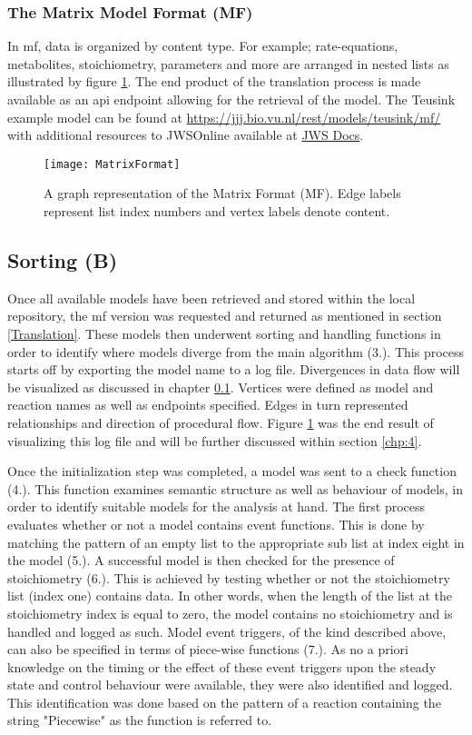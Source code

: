 \subsubsection{The Matrix Model Format (MF)}
In \gls{mf}, data is organized by content type. For example; rate-equations, metabolites, stoichiometry, parameters and more are arranged in nested lists as illustrated by figure \ref{fig:MatrixFormat}. The end product of the translation process is made available as an \gls{api} endpoint allowing for the retrieval of the model. The Teusink example model can be found at \href{https://jjj.bio.vu.nl/rest/models/teusink/mf/}{https://jjj.bio.vu.nl/rest/models/teusink/mf/} with additional resources to JWSOnline available at \href{http://jws-docs.readthedocs.io/8_rest.html}{JWS Docs}.

\begin{figure}[p]
\texttt{[image: MatrixFormat]}
\centering
\caption{A graph representation of the Matrix Format (MF). Edge labels represent list index numbers and vertex labels denote content.}
\label{fig:MatrixFormat}
\end{figure}

\subsection{Sorting (B)}
Once all available models have been retrieved and stored within the local repository, the mf version was requested and returned as mentioned in section \ref{Translation}. These models then underwent sorting and handling functions in order to identify where models diverge from the main algorithm (3.). This process starts off by exporting the model name to a log file. Divergences in data flow will be visualized as discussed in chapter \ref{}. Vertices were defined as model and reaction names as well as endpoints specified. Edges in turn represented relationships and direction of procedural flow. Figure \ref{fig:MatrixFormat} was the end result of visualizing this log file and will be further discussed within section \ref{chp:4}. 

Once the initialization step was completed, a model was sent to a check function (4.). This function examines semantic structure as well as behaviour of models, in order to identify suitable models for the analysis at hand. The first process evaluates whether or not a model contains event functions. This is done by matching the pattern of an empty list to the appropriate sub list at index eight in the model (5.). A successful model is then checked for the presence of stoichiometry (6.). This is achieved by testing whether or not the stoichiometry list (index one) contains data. In other words, when the length of the list at the stoichiometry index is equal to zero, the model contains no stoichiometry and is handled and logged as such. Model event triggers, of the kind described above, can also be specified in terms of piece-wise functions (7.). As no a priori knowledge on the timing or the effect of these event triggers upon the steady state and control behaviour were available, they were also identified and logged. This identification was done based on the pattern of a reaction containing the string "Piecewise" as the function is referred to. 

